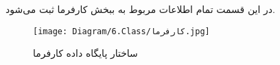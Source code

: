 در این قسمت تمام اطلاعات مربوط به ببخش کارفرما ثبت می‌شود.

\begin{figure}[H]
	\texttt{[image: Diagram/6.Class/کارفرما.jpg]}
	\centering
	\caption{ساختار پایگاه داده کارفرما}
	\label{fig:db:کارفرما}
\end{figure}